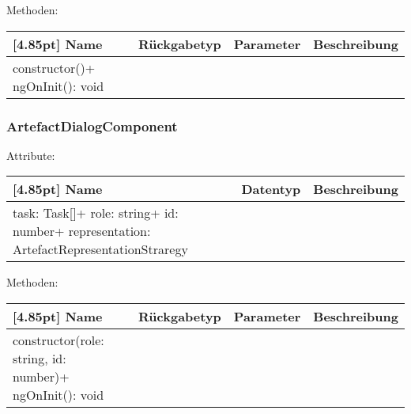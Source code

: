                 Methoden:
        		\begin{center}
                \setlength\tabcolsep{5pt}
                	\renewcommand{\arraystretch}{1.5}
                    	\begin{tabularx}{\textwidth}{|l|l|l|X|}
                    	\hline
                    	\rowcolor[gray]{0.75}[4.85pt]
                		Name & Rückgabetyp & Parameter & Beschreibung \\ \hline 
                		constructor()+ ngOnInit(): void
                        & & &  \\ \hline
                        \end{tabularx}
        		\end{center}
        	
        	\subsubsection{ArtefactDialogComponent}
        	
        	    Attribute:
                \begin{center}
                	\renewcommand{\arraystretch}{1.5}
                    \setlength\tabcolsep{5pt}
                	\begin{tabularx}{\textwidth}{|l|l|X|}
                		\hline
                        \rowcolor[gray]{0.75}[4.85pt]            		
                        Name & Datentyp & Beschreibung \\ \hline
                        task: Task[]+ role: string+ id: number+ representation: ArtefactRepresentationStraregy
                        & &  \\ \hline
                	\end{tabularx}
                \end{center}
                
                Methoden:
        		\begin{center}
                \setlength\tabcolsep{5pt}
                	\renewcommand{\arraystretch}{1.5}
                    	\begin{tabularx}{\textwidth}{|l|l|l|X|}
                    	\hline
                    	\rowcolor[gray]{0.75}[4.85pt]
                		Name & Rückgabetyp & Parameter & Beschreibung \\ \hline
                		constructor(role: string, id: number)+ ngOnInit(): void
                        & & &  \\ \hline
                        \end{tabularx}
        		\end{center}
        	
